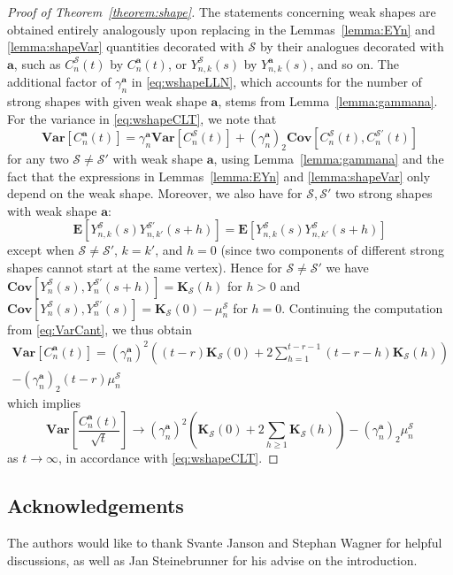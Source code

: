 \documentclass[a4paper,11pt,reqno]{amsart}
\newcommand{\bE}{\mathbf{E}}
\newcommand{\bVar}{\mathbf{Var}}
\newcommand{\bCov}{\mathbf{Cov}}
\newcommand{\shape}{\mathscr{S}}
\newcommand{\mb}{\mathbf}
\theoremstyle{definition}
\begin{document}
\begin{proof}[Proof of Theorem~\ref{theorem:shape}]
 The statements concerning weak shapes are obtained entirely analogously upon replacing in the Lemmas~\ref{lemma:EYn} and \ref{lemma:shapeVar} quantities decorated with $\shape$ by their analogues decorated with $\mb a$, such as $C_n^\shape(t)$ by $C_n^{\mb a}(t)$, or $Y_{n,k}^\shape(s)$ by $Y_{n,k}^{\mb a}(s)$, and so on. The additional factor of $\gamma_n^{\mb a}$ in \eqref{eq:wshapeLLN}, which accounts for the number of strong shapes with given weak shape $\mb a$, stems from Lemma~\ref{lemma:gammana}. For the variance in \eqref{eq:wshapeCLT}, we note that 
 \begin{equation}\label{eq:VarCant}
  \bVar\left[C_n^{\mb a}(t)\right] = \gamma_n^{\mb a} \bVar\left[C_n^\shape(t)\right] + (\gamma_n^{\mb a})_2\bCov\left[C_n^\shape(t),C_n^{\shape'}(t)\right]
 \end{equation}
 for any two $\shape\neq \shape'$ with weak shape $\mb a$, using Lemma~\ref{lemma:gammana} and the fact that the expressions in Lemmas~\ref{lemma:EYn} and \ref{lemma:shapeVar} only depend on the weak shape. Moreover, we also have for $\shape, \shape'$ two strong shapes with weak shape $\mb a$:
 \[
  \bE\left[Y_{n,k}^\shape(s)Y_{n,k'}^{\shape'}(s+h)\right] = \bE\left[Y_{n,k}^\shape(s)Y_{n,k'}^\shape(s+h)\right]
 \]
 except when $\shape\neq\shape'$, $k=k'$, and $h=0$ (since two components of different strong shapes cannot start at the same vertex). Hence for $\shape\neq\shape'$ we have $\bCov\left[Y_n^\shape(s),Y_n^{\shape'}(s+h)\right]=\mb K_{\shape}(h)$ for $h>0$ and $\bCov\left[Y_n^\shape(s),Y_n^{\shape'}(s)\right]=\mb K_{\shape}(0)-\mu_n^\shape$ for $h=0$. Continuing the computation from \eqref{eq:VarCant}, we thus obtain
 \begin{multline*}
  \bVar\left[C_n^{\mb a}(t)\right] = (\gamma_n^{\mb a})^2\left((t-r)\mb K_\shape(0) + 2 \sum_{h=1}^{t-r-1} (t-r-h) \mb K_\shape(h)\right)\\
  - (\gamma_n^{\mb a})_2 (t-r)\mu_n^\shape
 \end{multline*}
 which implies 
 \[
  \bVar\left[\frac{C_n^{\mb a}(t)}{\sqrt{t}}\right] \to (\gamma_n^{\mb a})^2\left(\mb K_\shape(0) + 2 \sum_{h\geq1} \mb K_\shape(h)\right) - (\gamma_n^{\mb a})_2 \mu_n^\shape
 \]
 as $t\to\infty$, in accordance with \eqref{eq:wshapeCLT}.
\end{proof}



\subsection*{Acknowledgements} The authors would like to thank Svante Janson and Stephan Wagner for helpful discussions, as well as Jan Steinebrunner for his advise on the introduction. 







\end{document}
